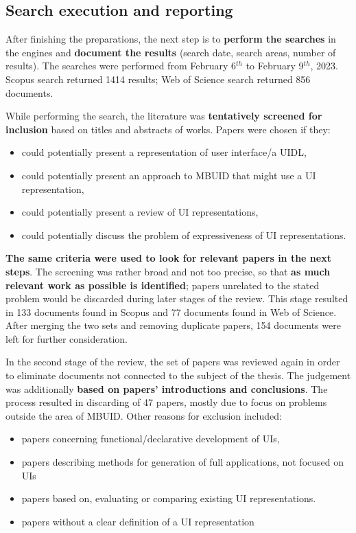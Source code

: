 \subsection{Search execution and reporting}\label{subsec:search-execution-and-reporting}

After finishing the preparations, the next step is to \textbf{perform the searches} in the engines and \textbf{document the results} (search date, search areas, number of results).
The searches were performed from February 6$^{th}$ to February 9$^{th}$, 2023.
Scopus search returned 1414 results;
Web of Science search returned 856 documents.

While performing the search, the literature was \textbf{tentatively screened for inclusion} based on titles and abstracts of works.
Papers were chosen if they:
\begin{itemize}
    \item could potentially present a representation of user interface/a UIDL,
    \item could potentially present an approach to MBUID that might use a UI representation,
    \item could potentially present a review of UI representations,
    \item could potentially discuss the problem of expressiveness of UI representations.
\end{itemize}
\textbf{The same criteria were used to look for relevant papers in the next steps}.
The screening was rather broad and not too precise, so that \textbf{as much relevant work as possible is identified};
papers unrelated to the stated problem would be discarded during later stages of the review.
This stage resulted in 133 documents found in Scopus and 77 documents found in Web of Science.
After merging the two sets and removing duplicate papers, 154 documents were left for further consideration.

In the second stage of the review, the set of papers was reviewed again in order to eliminate documents not connected to the subject of the thesis.
The judgement was additionally \textbf{based on papers' introductions and conclusions}.
The process resulted in discarding of 47 papers, mostly due to focus on problems outside the area of MBUID\@.
Other reasons for exclusion included:
\begin{itemize}
    \item papers concerning functional/declarative development of UIs,
    \item papers describing methods for generation of full applications, not focused on UIs
    \item papers based on, evaluating or comparing existing UI representations.
    \item papers without a clear definition of a UI representation
\end{itemize}

